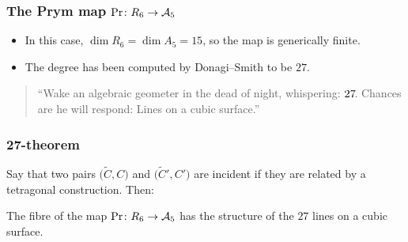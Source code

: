 \begin{frame}
\frametitle{The Prym map $\Pr \colon R_6 \to \mathcal{A}_5$}

\begin{itemize}
	\item In this case, $\dim R_6 = \dim A_5 = 15$, so the map is generically finite.
	\pause
	\item The degree has been computed by Donagi--Smith to be $27$.
\end{itemize}

\pause

\vfill
\begin{quote}
    \large
    ``Wake an algebraic geometer in the dead of night, \phantom{``}whispering: $27\mkern-3mu$. Chances are he will respond: Lines on a \phantom{``}cubic surface.''
\end{quote}
\vfill 

\end{frame}

\begin{frame}
\frametitle{27-theorem}

Say that two pairs $\Big(\widetilde C, C\Big)$ and $\Big(\widetilde C', C'\Big)$ are \alert{incident} if they are related by a tetragonal construction. Then:

\pause
\hfill
\hfill

\begin{theorem}
The fibre of the map $\Pr \colon R_6 \to \mathcal{A}_5$ has the structure of the $27$ lines on a cubic surface.
\end{theorem}

\end{frame}